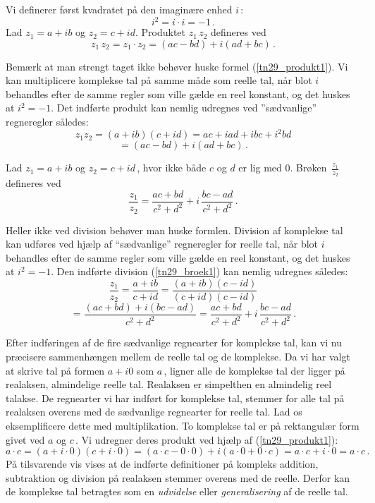\begin{definition}\label{tn29_produkt}
Vi definerer først kvadratet på den imaginære enhed $i\,$:
$$i^2=i\cdot i =-1\,.$$
Lad $z_1=a+ib$ og $z_2=c+id$.\bs
Produktet $z_1\,z_2$ defineres ved
\begin{equation}\label{tn29_produkt1}
z_1\,z_2=z_1\cdot z_2= (ac-bd)+i(ad+bc)\,.
\end{equation}
\end{definition}
\begin{aha}
Bemærk at man strengt taget ikke behøver huske formel (\ref{tn29_produkt1}). Vi kan  multiplicere  komplekse tal på samme måde som reelle tal, når blot $i$ behandles efter de samme regler som ville gælde en reel konstant, og det huskes at $i^2=-1$. Det indførte produkt kan nemlig udregnes ved ''sædvanlige'' regneregler således:
$$z_1z_2=(a+ib)(c+id)=ac+iad+ibc+i^2bd$$
$$=(ac-bd)+i(ad+bc)\,.$$
\end{aha}

\begin{definition}\label{tn29_broek}
Lad $z_1=a+ib$ og $z_2=c+id\,$, hvor ikke både $c$ og $d$ er lig med $0$.\bs
Brøken $\,\displaystyle{\frac{z_1}{z_2}}\,$ defineres ved 
\begin{equation}\label{tn29_broek1}
\frac{z_1}{z_2}=\frac{ac+bd}{c^2+d^2}+i\,\frac{bc-ad}{c^2+d^2}\,.
\end{equation}
\end{definition}

\begin{aha}
Heller ikke ved division behøver man huske formlen.  Division af komplekse tal kan udføres ved hjælp af ``sædvanlige'' regneregler for reelle tal, når blot $i$ behandles efter de samme regler som ville gælde en reel konstant, og det huskes at $i^2=-1$. Den indførte division (\ref{tn29_broek1}) kan nemlig udregnes således:\\
$$\frac{z_1}{z_2}=\frac{a+ib}{c+id}
=\frac{(a+ib)(c-id)}{(c+id)(c-id)}$$
$$=\frac{(ac+bd)+i(bc-ad)}{c^2+d^2}
=\frac{ac+bd}{c^2+d^2}+i\,\frac{bc-ad}{c^2+d^2}\,.$$
\end{aha}

Efter indføringen af de fire sædvanlige regnearter for komplekse tal, kan vi nu præcisere sammenhængen mellem de reelle tal og de komplekse. Da vi har valgt at skrive tal på formen $a+i0$ som $a\,$, ligner alle de komplekse tal der ligger på realaksen, almindelige reelle tal. Realaksen er simpelthen en almindelig reel talakse. De regnearter vi har indført for komplekse tal, stemmer for alle tal på realaksen overens med de sædvanlige regnearter for reelle tal. Lad os eksemplificere dette med multiplikation.\bs
To komplekse tal er på rektangulær form givet ved $a$ og $c\,$. Vi udregner deres produkt ved hjælp af (\ref{tn29_produkt1}):
$$
a\cdot c=(a+i\cdot0)(c+i\cdot0)=(a\cdot c-0\cdot0)+i(a\cdot0+0\cdot c)=a\cdot c+i\cdot0=a\cdot c\,.
$$
På tilsvarende vis vises at de indførte definitioner på kompleks addition, subtraktion og division på realaksen stemmer overens med de reelle.\bs
Derfor kan de komplekse tal betragtes som en \textit{udvidelse} eller \textit{generalisering} af de reelle tal.


